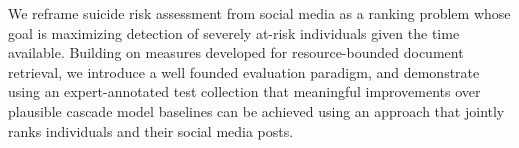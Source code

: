 We reframe suicide risk assessment from social media as a ranking problem whose goal is maximizing detection of severely at-risk individuals given the time available. Building on measures developed for resource-bounded document retrieval, we introduce a well founded evaluation paradigm, and demonstrate using an expert-annotated test collection that meaningful improvements over plausible cascade model baselines can be achieved using an approach that jointly ranks individuals and their social media posts.
